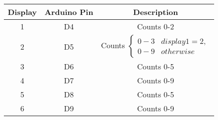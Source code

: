\begin{tabular}{|c|c|c|}
\hline
Display & Arduino Pin & Description\\
\hline
1  & D4 & Counts 0-2 \\
\hline
2  & D5 & Counts 
$
\begin{cases}
	0-3 & display 1 = 2, \\
	0-9 & otherwise
\end{cases}
$
\\
\hline
3  & D6 & Counts 0-5 \\
\hline
4  & D7 & Counts 0-9 \\
\hline
5 & D8 & Counts 0-5 \\
\hline
6  & D9 & Counts 0-9 \\
\hline
\end{tabular}
